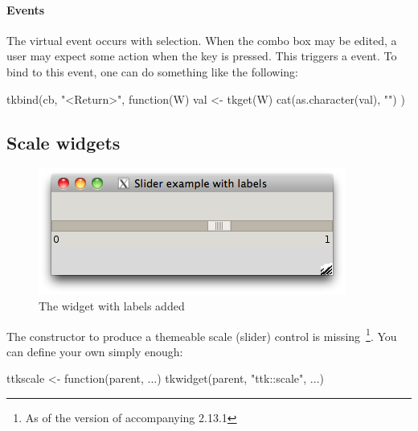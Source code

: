 \paragraph{Events}
The virtual event  occurs with
selection. When the combo box may be edited, a user may expect some
action when the  key is pressed. This triggers a
 event. To bind to this event, one can do something
like the following:

\begin{Schunk}
\begin{Sinput}
 tkbind(cb, "<Return>", function(W) {
   val <- tkget(W)
   cat(as.character(val), "\n")
 })
\end{Sinput}
\end{Schunk}







\subsection{Scale widgets}
\label{sec:tcltk:scale-widgets}


\begin{figure}
  \centering
  \includegraphics[width=.5\textwidth]{fig-tcltk-slider-labels.png}
  \caption{The  widget with labels added}
  \label{fig:tcltk-slider-labels}
\end{figure}

The  constructor to produce a themeable scale
(slider) control is missing~\footnote{As of the version of 
  accompanying \R{} 2.13.1}. You can define your own simply enough:
\begin{Schunk}
\begin{Sinput}
 ttkscale <- function(parent, ...) 
   tkwidget(parent, "ttk::scale", ...)
\end{Sinput}
\end{Schunk}

